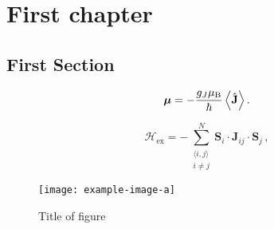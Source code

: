\chapter{First chapter}
\label{chap:magnetism-theory}

\lipsum[1] \cite{einstein} \lipsum[2-4]

\section{First Section}

\lipsum[5-7]

\begin{equation}
    \bm{\mu} = -\frac{g_{J}\mu_{\text{B}}}{\hbar} \expval{\hat{\mathbf{J}}}.
    \label{eq:total-magnetic-moment}
\end{equation}

\lipsum[8]

\begin{equation}
    \mathscr{H}_{\text{ex}} =
    -\sum_{\substack{\langle i,j\rangle \\ i \neq j}}^{N} \mathbf{S}_i \cdot \mathbf{J}_{ij} \cdot \mathbf{S}_j \,,
    \label{eq:heisenberg-exchange}
\end{equation}

\lipsum[4]

\begin{figure}[t!]
    \centering
    \texttt{[image: example-image-a]}

    \caption{Title of figure}{\lipsum[2]}

    \label{fig:some-fig}
\end{figure}%

\lipsum[5]

